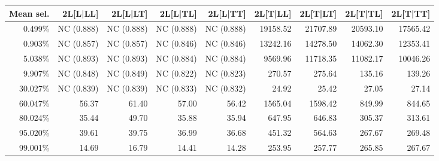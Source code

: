 {\begin{table}[htbp]
{\begin{tabular}{rrrrrrrrr}
\toprule
Mean sel. & 2L[L|LL] & 2L[L|LT] & 2L[L|TL] & 2L[L|TT] & 2L[T|LL] & 2L[T|LT] & 2L[T|TL] & 2L[T|TT] \\
\midrule
0.499\% & NC (0.888) & NC (0.888) & NC (0.888) & NC (0.888) & 19158.52 & 21707.89 & 20593.10 & 17565.42 \\
0.903\% & NC (0.857) & NC (0.857) & NC (0.846) & NC (0.846) & 13242.16 & 14278.50 & 14062.30 & 12353.41 \\
5.038\% & NC (0.893) & NC (0.893) & NC (0.884) & NC (0.884) & 9569.96 & 11718.35 & 11082.17 & 10046.26 \\
9.907\% & NC (0.848) & NC (0.849) & NC (0.822) & NC (0.823) & 270.57 & 275.64 & 135.16 & 139.26 \\
30.027\% & NC (0.839) & NC (0.839) & NC (0.833) & NC (0.832) & 24.92 & 25.42 & 27.05 & 27.14 \\
60.047\% & 56.37 & 61.40 & 57.00 & 56.42 & 1565.04 & 1598.42 & 849.99 & 844.65 \\
80.024\% & 35.44 & 49.70 & 35.88 & 35.94 & 647.95 & 646.83 & 305.37 & 313.61 \\
95.020\% & 39.61 & 39.75 & 36.99 & 36.68 & 451.32 & 564.63 & 267.67 & 269.48 \\
99.001\% & 14.69 & 16.79 & 14.41 & 14.28 & 253.95 & 257.77 & 265.85 & 267.67 \\
\bottomrule
\end{tabular}
}
\end{table}
}
